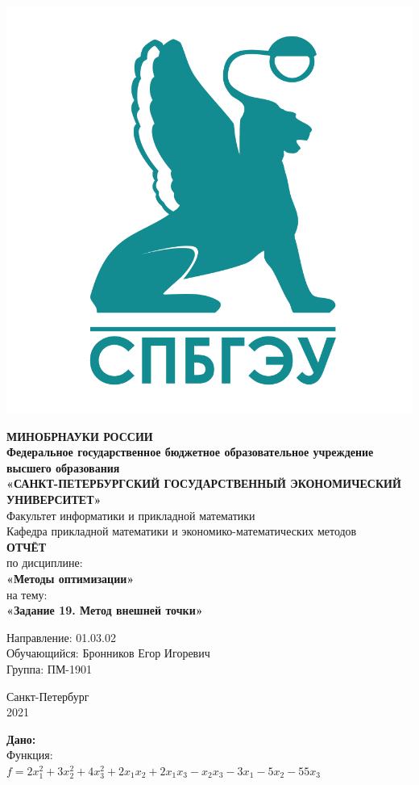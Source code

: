 \documentclass[14pt,a4paper,fleqn]{extarticle}
\begin{document}
	\begin{titlepage}
		\includegraphics[scale=0.12]{logo}
		\begin{center}
			\textbf{МИНОБРНАУКИ РОССИИ}\\
			\vspace{0.2cm}
			\textbf{Федеральное государственное бюджетное образовательное учреждение высшего образования}\\
			\textbf{«САНКТ-ПЕТЕРБУРГСКИЙ ГОСУДАРСТВЕННЫЙ ЭКОНОМИЧЕСКИЙ УНИВЕРСИТЕТ»}\\
			\vspace{0.6cm}
			Факультет информатики и прикладной математики\\
			Кафедра прикладной математики и экономико-математических методов\\
			\vspace{1cm}
			\textbf{ОТЧЁТ}\\
			по дисциплине:\\
			\textbf{«Методы оптимизации»}\\
			на тему:\\
			\textbf{«Задание 19. Метод внешней точки»}\\
		\end{center}
		\vspace{1cm}
		Направление: 01.03.02\\
		Обучающийся: Бронников Егор Игоревич\\
		Группа: ПМ-1901\\
		\vfill
		\begin{center}
			Санкт-Петербург\\
			2021\\
		\end{center}
	\end{titlepage}
	\textbf{Дано:}\\
	Функция:\\
	$f = 2x_1^2 + 3x_2^2 + 4x_3^2 + 2x_1x_2 + 2x_1x_3 - x_2x_3 - 3x_1 - 5x_2 - 55x_3$\\
	
\end{document}
